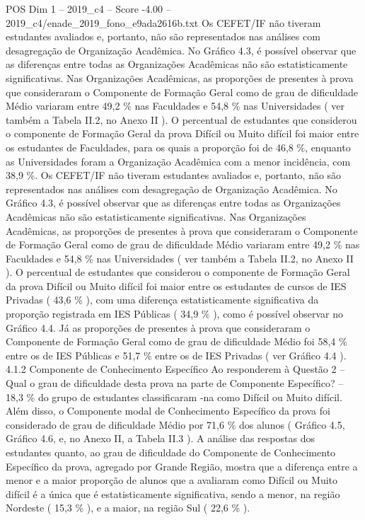 \begin{textsample}{POS Dim 1 – 2019\_c4 – Score -4.00 – 2019\_c4/enade\_2019\_fono\_e9ada2616b.txt}
Os CEFET/IF não tiveram estudantes avaliados e, portanto, não são representados nas análises com desagregação de Organização Acadêmica.
No Gráfico 4.3, é possível observar que as diferenças entre todas as Organizações Acadêmicas não são estatisticamente significativas.
Nas Organizações Acadêmicas, as proporções de presentes à prova que consideraram o Componente de Formação Geral como de grau de dificuldade Médio variaram entre 49,2 \% nas Faculdades e 54,8 \% nas Universidades ( ver também a Tabela II.2, no Anexo II ).
O percentual de estudantes que considerou o componente de Formação Geral da prova Difícil ou Muito difícil foi maior entre os estudantes de Faculdades, para os quais a proporção foi de 46,8 \%, enquanto as Universidades foram a Organização Acadêmica com a menor incidência, com 38,9 \%.
Os CEFET/IF não tiveram estudantes avaliados e, portanto, não são representados nas análises com desagregação de Organização Acadêmica.
No Gráfico 4.3, é possível observar que as diferenças entre todas as Organizações Acadêmicas não são estatisticamente significativas.
Nas Organizações Acadêmicas, as proporções de presentes à prova que consideraram o Componente de Formação Geral como de grau de dificuldade Médio variaram entre 49,2 \% nas Faculdades e 54,8 \% nas Universidades ( ver também a Tabela II.2, no Anexo II ).
O percentual de estudantes que considerou o componente de Formação Geral da prova Difícil ou Muito difícil foi maior entre os estudantes de cursos de IES Privadas ( 43,6 \% ), com uma diferença estatisticamente significativa da proporção registrada em IES Públicas ( 34,9 \% ), como é possível observar no Gráfico 4.4.
Já as proporções de presentes à prova que consideraram o Componente de Formação Geral como de grau de dificuldade Médio foi 58,4 \% entre os de IES Públicas e 51,7 \% entre os de IES Privadas ( ver Gráfico 4.4 ). 4.1.2 Componente de Conhecimento Específico Ao responderem à Questão 2 – Qual o grau de dificuldade desta prova na parte de Componente Específico? – 18,3 \% do grupo de estudantes classificaram -na como Difícil ou Muito difícil.
Além disso, o Componente modal de Conhecimento Específico da prova foi considerado de grau de dificuldade Médio por 71,6 \% dos alunos ( Gráfico 4.5, Gráfico 4.6, e, no Anexo II, a Tabela II.3 ).
A análise das respostas dos estudantes quanto, ao grau de dificuldade do Componente de Conhecimento Específico da prova, agregado por Grande Região, mostra que a diferença entre a menor e a maior proporção de alunos que a avaliaram como Difícil ou Muito difícil é a única que é estatisticamente significativa, sendo a menor, na região Nordeste ( 15,3 \% ), e a maior, na região Sul ( 22,6 \% ).

\end{textsample}
